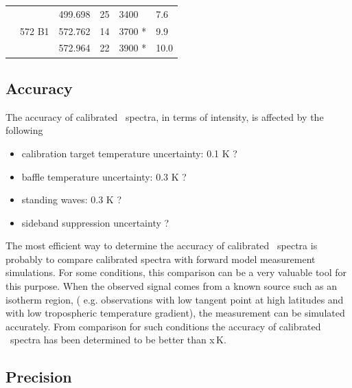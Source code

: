\begin{table}
\begin{tabular}{|l|l|l|l|l|l|}
  \cline{3-3}
  \cline{4-4}
  \cline{5-5}
  \cline{6-6}
                &                      & 499.698                   & 25           & 3400                 & 7.6 \\
  \cline{2-2}
  \cline{3-3}
  \cline{4-4}
  \cline{5-5}
  \cline{6-6}
                & 572 B1              & 572.762                    & 14           & 3700 *              & 9.9 \\
  \cline{3-3}
  \cline{4-4}
  \cline{5-5}
  \cline{6-6}
                &                     & 572.964                    & 22           & 3900 *              & 10.0 \\
  \hline
\end{tabular}
\end{table}

\subsection*{Accuracy}

The accuracy of calibrated \smr\ spectra, in terms of intensity, is affected by the following

\begin{itemize}

\item calibration target temperature uncertainty: 0.1 K ?

\item baffle temperature uncertainty: 0.3 K ?

\item standing waves: 0.3 K ?

\item sideband suppression uncertainty ? 

\end{itemize}

The most efficient way to determine the accuracy of calibrated \smr\ spectra
is probably to compare calibrated spectra with forward model measurement
simulations. For some conditions, this comparison can be a very valuable
tool for this purpose.
When the observed signal comes from a known source such as an isotherm
region,  ( e.g. observations with low tangent point at high latitudes 
and with low tropospheric temperature gradient),
the measurement can be simulated accurately.
From comparison for such conditions the accuracy of calibrated
\smr\ spectra has been determined to be better than x\,K.
 


\subsection*{Precision}

